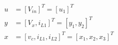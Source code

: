 
\begin{align*}
  \tag{Entradas del sistema}
  u &= \left[ V_{in} \right]^T  = [u_1]^T \\
  \tag{Saildas del sistema}
  y &= \left[ V_x, i_{L1} \right]^T = [y_1, y_2]^T \\
  \tag{Estados del sistema}
  x &= \left[ v_c, i_{L1}, i_{L2} \right]^T = [x_1, x_2, x_3]^T
\end{align*}

